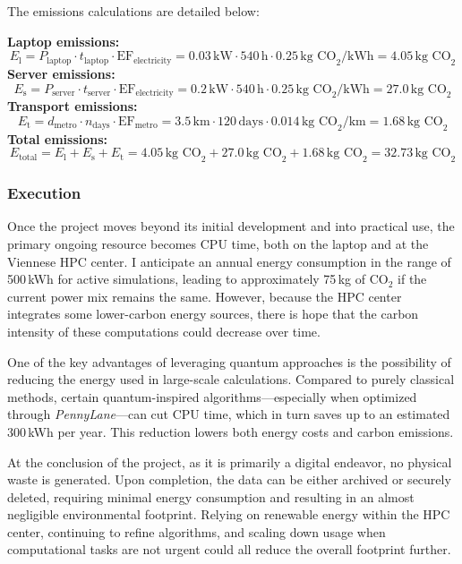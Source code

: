 The emissions calculations are detailed below:
\begin{ProjectStructure}
    \textbf{Laptop emissions:}
    \[
    E_{\text{l}} = P_{\text{laptop}} \cdot t_{\text{laptop}} \cdot \text{EF}_{\text{electricity}} = 0.03 \, \text{kW} \cdot 540 \, \text{h} \cdot 0.25 \, \text{kg CO}_2/\text{kWh} = 4.05 \, \text{kg CO}_2 
    \]
    \textbf{Server emissions:}
    \[
    E_{\text{s}} = P_{\text{server}} \cdot t_{\text{server}} \cdot \text{EF}_{\text{electricity}} = 0.2 \, \text{kW} \cdot 540 \, \text{h} \cdot 0.25 \, \text{kg CO}_2/\text{kWh} = 27.0 \, \text{kg CO}_2
    \]
    \textbf{Transport emissions:}
    \[
    E_{\text{t}} = d_{\text{metro}} \cdot n_{\text{days}} \cdot \text{EF}_{\text{metro}} = 3.5 \, \text{km} \cdot 120 \, \text{days} \cdot 0.014 \, \text{kg CO}_2/\text{km} = 1.68 \, \text{kg CO}_2
    \]
    \textbf{Total emissions:}
    \[
    E_{\text{total}} = E_{\text{l}} + E_{\text{s}} + E_{\text{t}} = 4.05 \, \text{kg CO}_2 + 27.0 \, \text{kg CO}_2 + 1.68 \, \text{kg CO}_2 = 32.73 \, \text{kg CO}_2
    \]
\end{ProjectStructure}

\subsubsection{Execution}
Once the project moves beyond its initial development and into practical use, the primary ongoing resource becomes CPU time, both on the laptop and at the Viennese HPC center. I anticipate an annual energy consumption in the range of 500\,kWh for active simulations, leading to approximately 75\,kg of CO\(_2\) if the current power mix remains the same. However, because the HPC center integrates some lower-carbon energy sources, there is hope that the carbon intensity of these computations could decrease over time.

One of the key advantages of leveraging quantum approaches is the possibility of reducing the energy used in large-scale calculations. Compared to purely classical methods, certain quantum-inspired algorithms—especially when optimized through \emph{PennyLane}—can cut CPU time, which in turn saves up to an estimated 300\,kWh per year. This reduction lowers both energy costs and carbon emissions.

At the conclusion of the project, as it is primarily a digital endeavor, no physical waste is generated. Upon completion, the data can be either archived or securely deleted, requiring minimal energy consumption and resulting in an almost negligible environmental footprint. Relying on renewable energy within the HPC center, continuing to refine algorithms, and scaling down usage when computational tasks are not urgent could all reduce the overall footprint further.

